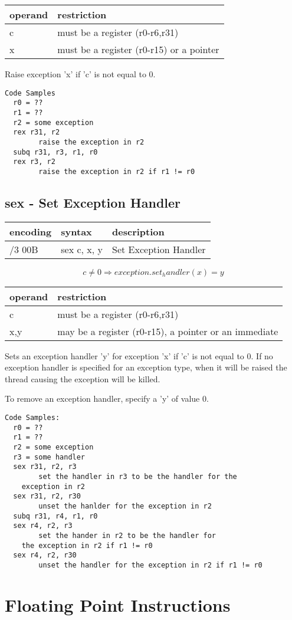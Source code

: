 \documentclass[letterpaper,10pt,openright,twoside,onecolumn]{book}
\begin{document}
  \flushleft
  \begin{tabular}{|l|l|}
   \hline
    operand & restriction \\
   \hline
    c & must be a register (r0-r6,r31) \\
    x & must be a register (r0-r15) or a pointer \\
   \hline
  \end{tabular}

  Raise exception 'x' if 'c' is not equal to 0.

  \begin{verbatim}
Code Samples
  r0 = ??
  r1 = ??
  r2 = some exception
  rex r31, r2
        raise the exception in r2
  subq r31, r3, r1, r0
  rex r3, r2
        raise the exception in r2 if r1 != r0
  \end{verbatim}
\newpage\subsection{sex - Set Exception Handler}
  \begin{tabular}{|l|l|l|}
   \hline
    encoding & syntax & description \\
   \hline
    /3 00B & sex c, x, y & Set Exception Handler \\
   \hline
  \end{tabular}

  \begin{displaymath} c \neq 0 \Rightarrow exception.set_handler(x) = y\end{displaymath}

  \flushleft
  \begin{tabular}{|l|l|}
   \hline
    operand & restriction \\
   \hline
    c & must be a register (r0-r6,r31) \\
    x,y & may be a register (r0-r15), a pointer or an immediate \\
   \hline
  \end{tabular}

  Sets an exception handler 'y' for exception 'x' if 'c' is not equal to 0.  If no exception
  handler is specified for an exception type, when it will be raised the thread causing the
  exception will be killed.

  To remove an exception handler, specify a 'y' of value 0.

  \begin{verbatim}
Code Samples:
  r0 = ??
  r1 = ??
  r2 = some exception
  r3 = some handler
  sex r31, r2, r3
        set the handler in r3 to be the handler for the
	exception in r2
  sex r31, r2, r30
        unset the hanlder for the exception in r2
  subq r31, r4, r1, r0
  sex r4, r2, r3
        set the hander in r2 to be the handler for
	the exception in r2 if r1 != r0
  sex r4, r2, r30
        unset the handler for the exception in r2 if r1 != r0
  \end{verbatim}
\clearpage\section{Floating Point Instructions}
\end{document}
